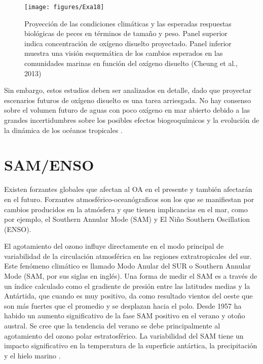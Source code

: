 \documentclass{umagthesis}
\begin{document}
\newpage

\begin{figure}

{\centering \texttt{[image: figures/Exa18]} 

}

\caption{Proyección de las condiciones climáticas y las esperadas respuestas biológicas de peces en términos de tamaño y peso. Panel superior indica concentración de oxígeno disuelto proyectado. Panel inferior muestra una visión esquemática de los cambios esperados en las comunidades marinas en función del oxígeno disuelto (Cheung et al., 2013)}\label{fig:unnamed-chunk-3}
\end{figure}

Sin embargo, estos estudios deben ser analizados en detalle, dado que proyectar escenarios futuros de oxígeno disuelto es una tarea arriesgada. No hay consenso sobre el volumen futuro de aguas con poco oxígeno en mar abierto debido a las grandes incertidumbres sobre los posibles efectos biogeoquímicos y la evolución de la dinámica de los océanos tropicales \autocite{IPCC2014}.

\hypertarget{samenso}{%
\section{SAM/ENSO}\label{samenso}}

Existen forzantes globales que afectan al OA en el presente y también afectarán en el futuro. Forzantes atmosférico-oceanógraficos son los que se manifiestan por cambios producidos en la atmósfera y que tienen implicancias en el mar, como por ejemplo, el Southern Annular Mode (SAM) y El Niño Southern Oscillation (ENSO).

El agotamiento del ozono influye directamente en el modo principal de variabilidad de la circulación atmosférica en las regiones extratropicales del sur. Este fenómeno climático es llamado Modo Anular del SUR o Southern Annular Mode (SAM, por sus siglas en inglés). Una forma de medir el SAM es a través de un índice calculado como el gradiente de presión entre las latitudes medias y la Antártida, que cuando es muy positivo, da como resultado vientos del oeste que son más fuertes que el promedio y se desplazan hacia el polo. Desde 1957 ha habido un aumento significativo de la fase SAM positivo en el verano y otoño austral. Se cree que la tendencia del verano se debe principalmente al agotamiento del ozono polar estratosférico. La variabilidad del SAM tiene un impacto significativo en la temperatura de la superficie antártica, la precipitación y el hielo marino \autocite{Marshall2018}.
\end{document}

